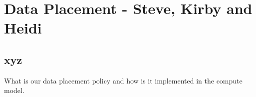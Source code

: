 \chapter{Data Placement - Steve, Kirby and Heidi}
\label{ch:place}

\section{xyz}
\label{sec:places:xyz}  %

What is our data placement policy and how is it implemented in the compute model. 

